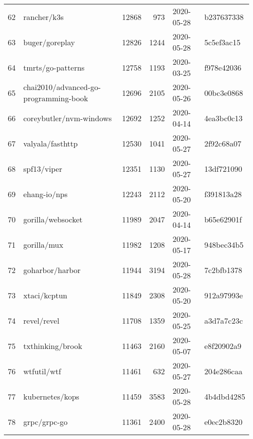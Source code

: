 \begin{footnotesize}
\begin{longtable}{llrrll}
        62  &                                        rancher/k3s &  12868 &    973 & 2020-05-28 &  b237637338 \\
        63  &                                     buger/goreplay &  12826 &   1244 & 2020-05-28 &  5c5ef3ac15 \\
        64  &                                  tmrts/go-patterns &  12758 &   1193 & 2020-03-25 &  f978e42036 \\
        65  &              chai2010/advanced-go-programming-book &  12696 &   2105 & 2020-05-26 &  00bc3e0868 \\
        66  &                            coreybutler/nvm-windows &  12692 &   1252 & 2020-04-14 &  4ea3bc0c13 \\
        67  &                                   valyala/fasthttp &  12530 &   1041 & 2020-05-27 &  2f92c68a07 \\
        68  &                                        spf13/viper &  12351 &   1130 & 2020-05-27 &  13df721090 \\
        69  &                                       ehang-io/nps &  12243 &   2112 & 2020-05-20 &  f391813a28 \\
        70  &                                  gorilla/websocket &  11989 &   2047 & 2020-04-14 &  b65e62901f \\
        71  &                                        gorilla/mux &  11982 &   1208 & 2020-05-17 &  948bec34b5 \\
        72  &                                    goharbor/harbor &  11944 &   3194 & 2020-05-28 &  7c2bfb1378 \\
        73  &                                       xtaci/kcptun &  11849 &   2308 & 2020-05-20 &  912a97993e \\
        74  &                                        revel/revel &  11708 &   1359 & 2020-05-25 &  a3d7a7c23c \\
        75  &                                   txthinking/brook &  11463 &   2160 & 2020-05-07 &  e8f20902a9 \\
        76  &                                        wtfutil/wtf &  11461 &    632 & 2020-05-27 &  204e286caa \\
        77  &                                    kubernetes/kops &  11459 &   3583 & 2020-05-28 &  4b4dbd4285 \\
        78  &                                       grpc/grpc-go &  11361 &   2400 & 2020-05-28 &  e0ec2b8320 \\

\end{longtable}
\end{footnotesize}
